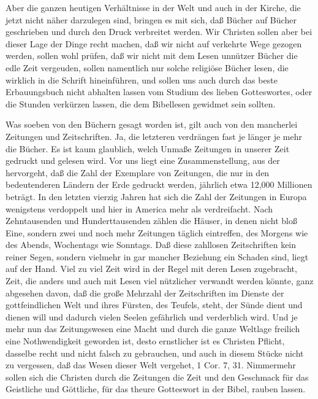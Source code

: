 Aber die ganzen heutigen Verhältnisse in der Welt und auch in der Kirche, die jetzt nicht näher darzulegen sind, bringen es mit sich, daß Bücher auf Bücher geschrieben und durch den Druck verbreitet werden. Wir Christen sollen
aber bei dieser Lage der Dinge recht machen, daß wir nicht auf verkehrte Wege gezogen werden, sollen wohl prüfen, daß wir nicht mit dem Lesen unnützer Bücher die edle Zeit vergeuden, sollen namentlich nur solche religiöse Bücher lesen, die wirklich in die Schrift hineinführen, und sollen uns auch durch das beste Erbauungsbuch nicht abhalten lassen vom Studium des lieben Gotteswortes, oder die Stunden verkürzen lassen, die dem Bibellesen gewidmet sein sollten.

Was soeben von den Büchern gesagt worden ist, gilt auch von den mancherlei Zeitungen und Zeitschriften. Ja, die letzteren verdrängen fast je länger je mehr die Bücher. Es ist kaum glaublich, welch Unmaße Zeitungen in unserer Zeit gedruckt und gelesen wird. Vor uns liegt eine Zusammenstellung, aus der hervorgeht, daß die Zahl der Exemplare von Zeitungen, die nur in den bedeutenderen Ländern der Erde gedruckt werden, jährlich etwa 12,000 Millionen beträgt. In den letzten vierzig Jahren hat sich die Zahl der Zeitungen in Europa wenigstens verdoppelt und hier in America mehr als verdreifacht. Nach Zehntausenden und Hunderttausenden zählen die Häuser, in denen nicht bloß Eine, sondern zwei und noch mehr Zeitungen täglich eintreffen, des Morgens wie des Abends, Wochentags wie Sonntags. Daß diese zahllosen Zeitschriften kein reiner Segen, sondern vielmehr in gar mancher Beziehung ein Schaden sind, liegt auf der Hand. Viel zu viel Zeit wird in der Regel mit deren Lesen zugebracht, Zeit, die anders und auch mit Lesen viel nützlicher verwandt werden könnte, ganz abgesehen davon, daß die große Mehrzahl der Zeitschriften im Dienste der gottfeindlichen Welt und ihres Fürsten, des Teufels, steht, der Sünde dient und dienen will und dadurch vielen Seelen gefährlich und verderblich wird. Und je mehr nun das Zeitungswesen eine Macht und durch die ganze Weltlage freilich eine Nothwendigkeit geworden ist, desto ernstlicher ist es Christen Pflicht, dasselbe recht und nicht falsch zu gebrauchen, und auch in diesem Stücke nicht zu vergessen, daß das Wesen dieser Welt vergehet, 1 Cor. 7, 31. Nimmermehr sollen sich die Christen durch die Zeitungen die Zeit und den Geschmack für das Geistliche und Göttliche, für das theure Gotteswort in der Bibel, rauben lassen.

